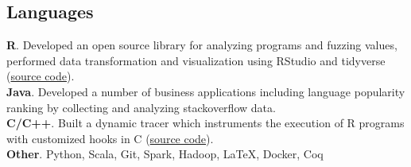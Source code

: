 \documentclass[margin,line]{resume}
\begin{document}
\begin{resume}
      
    \section{\mysidestyle Languages}
    \textbf{R}.  {\small Developed an open source library for analyzing programs and fuzzing values, performed data transformation and visualization using RStudio and tidyverse (\href{https://github.com/PRL-PRG/signatr}{source code}).}\\[\mymedskip]
    \textbf{Java}. {\small Developed a number of business applications including language popularity ranking by collecting and analyzing stackoverflow data.}\\[\mymedskip]
    \textbf{C/C++}. {\small Built a dynamic tracer which instruments the execution of R programs with customized hooks in C (\href{https://github.com/PRL-PRG/argtracer}{source code}).}
\\[\mymedskip]
    \textbf{Other}. Python, Scala, Git, Spark, Hadoop, \LaTeX, Docker, Coq






\end{resume}
\end{document}
